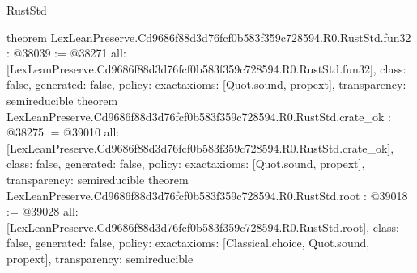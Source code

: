 \begin{lexlean}{RustStd}
\begin{coremodule}
{}
theorem LexLeanPreserve.Cd9686f88d3d76fcf0b583f359c728594.R0.RustStd.fun32 : @38039 := @38271 {
  all: [LexLeanPreserve.Cd9686f88d3d76fcf0b583f359c728594.R0.RustStd.fun32],
  class: false,
  generated: false,
  policy: exact{axioms: [Quot.sound, propext]},
  transparency: semireducible
}
theorem LexLeanPreserve.Cd9686f88d3d76fcf0b583f359c728594.R0.RustStd.crate_ok : @38275 := @39010 {
  all: [LexLeanPreserve.Cd9686f88d3d76fcf0b583f359c728594.R0.RustStd.crate_ok],
  class: false,
  generated: false,
  policy: exact{axioms: [Quot.sound, propext]},
  transparency: semireducible
}
theorem LexLeanPreserve.Cd9686f88d3d76fcf0b583f359c728594.R0.RustStd.root : @39018 := @39028 {
  all: [LexLeanPreserve.Cd9686f88d3d76fcf0b583f359c728594.R0.RustStd.root],
  class: false,
  generated: false,
  policy: exact{axioms: [Classical.choice, Quot.sound, propext]},
  transparency: semireducible
}


\end{coremodule}
\end{lexlean}
